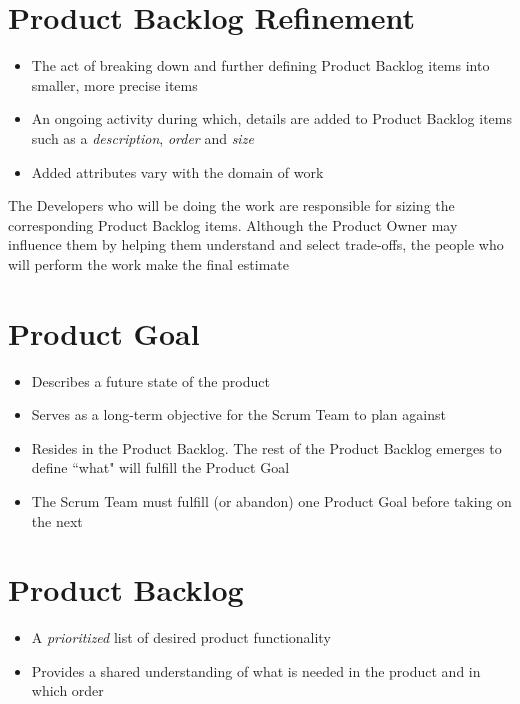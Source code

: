 \documentclass[a4paper,11pt,twocolumn]{article}
\begin{document}
\section*{Product Backlog Refinement}
\begin{itemize}
	\item The act of breaking down and further defining Product Backlog items into smaller, more precise items
	\item An ongoing activity during which, details are added to Product Backlog items such as a \textit{description}, \textit{order} and \textit{size}
	\item Added attributes vary with the domain of work
\end{itemize}

\begin{tcolorbox}[colback=black!8!white,colframe=gray!50!black,title=Note,sharp corners,fonttitle=\normalsize\bfseries,fontupper=\normalsize,left=0.7em,right=0.7em]
	The Developers who will be doing the work are responsible for sizing the corresponding Product Backlog items. Although the Product Owner may influence them by helping them understand and select trade-offs, the people who will perform the work make the final estimate
\end{tcolorbox}

\section*{Product Goal}
\begin{itemize}
	\item Describes a future state of the product 
	\item Serves as a long-term objective for the Scrum Team to plan against
	\item Resides in the Product Backlog. The rest of the Product Backlog emerges to define ``what" will fulfill the Product Goal
	\item The Scrum Team must fulfill (or abandon) one Product Goal before taking on the next
\end{itemize}


\section*{Product Backlog}
\begin{itemize}
	\item A \textit{prioritized} list of desired product functionality
	\item Provides a shared understanding of what is needed in the product and in which order
\end{itemize}
\end{document}
